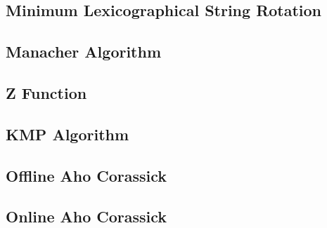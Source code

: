 \subsection{Minimum Lexicographical String Rotation}
\subsection{Manacher Algorithm}
\subsection{Z Function}
\subsection{KMP Algorithm}
\subsection{Offline Aho Corassick}
\subsection{Online Aho Corassick}
